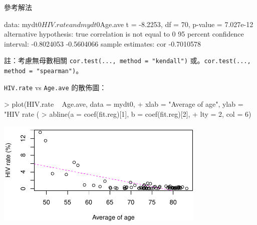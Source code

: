 \documentclass[14pt, aspectratio=43]{beamer}
\begin{document}
\begin{frame}{參考解法}
\begin{R}
data:  mydt0$HIV.rate and mydt0$Age.ave
t = -8.2253, df = 70, p-value = 7.027e-12
alternative hypothesis: true correlation is not equal to 0
95 percent confidence interval:
 -0.8024053 -0.5604066
sample estimates:
       cor 
-0.7010578 
\end{R}

\begin{minipage}{1\textwidth}
\tiny 註：考慮無母數相關 \verb!cor.test(..., method = "kendall")! 或。\verb!cor.test(..., method = "spearman")!。
\end{minipage}

\framebreak

\verb+HIV.rate+ vs \verb+Age.ave+ 的散佈圖：
\begin{RC}
> plot(HIV.rate ~ Age.ave, data = mydt0,
+      xlab = "Average of age", ylab = "HIV rate (%
> abline(a = coef(fit.reg)[1], b = coef(fit.reg)[2],
+        lty = 2, col = 6)
\end{RC}
\begin{center}\includegraphics[width=0.75\textwidth]{Rplot-test-lm.pdf}\end{center}

\end{frame}
\end{document}
